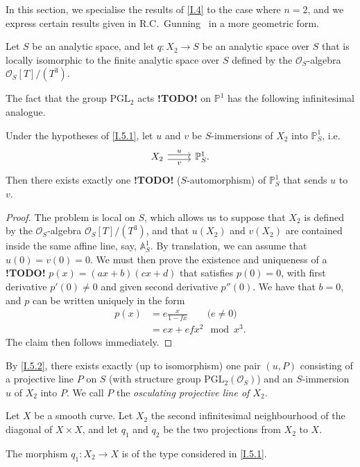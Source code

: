 \documentclass{report}
\theoremstyle{plain}
\newenvironment{lemma}[1]
    {\renewcommand\theinnercustomlemma{#1}\innercustomlemma}
    {\endinnercustomlemma}
\theoremstyle{definition}
\newenvironment{env}[1]
    {\renewcommand\theinnercustomenv{#1}\innercustomenv}
    {\endinnercustomenv}
\newcommand{\sh}{\mathscr}
\newcommand{\PP}{\mathbb{P}}
\renewcommand{\AA}{\mathbb{A}}
\newcommand{\todo}{\textbf{ !TODO! }}
\newcommand{\oldpage}[1]{\marginpar{\footnotesize$\Big\vert$ \textit{p.~#1}}}
\begin{document}
In this section, we specialise the results of \cref{I.4} to the case where $n=2$, and we express certain results given in R.C.~Gunning~\cite{11} in a more geometric form.

\begin{env}{5.1}
\label{I.5.1}
  Let $S$ be an analytic space, and let $q\colon X_2\to S$ be an analytic space over $S$ that is locally isomorphic to the finite analytic space over $S$ defined by the $\sh{O}_S$-algebra $\sh{O}_S[T]/(T^3)$.

  The fact that the group $\mathrm{PGL}_2$ acts \todo on $\PP^1$ has the following infinitesimal analogue.
\end{env}

\begin{lemma}{5.2}
\label{I.5.2}
  Under the hypotheses of \cref{I.5.1}, let $u$ and $v$ be $S$-immersions of $X_2$ into $\PP_S^1$, i.e.
  \[
    \begin{tikzcd}
      X_2 \rar[shift left=1,"u"] \rar[shift right=1,swap,"v"]
      & \PP_S^1.
    \end{tikzcd}
  \]
  Then there exists exactly one \todo ($S$-automorphism) of $\PP_S^1$ that sends $u$ to $v$.
\end{lemma}

\begin{proof}
  The problem is local on $S$, which allows us to suppose that $X_2$ is defined by the $\sh{O}_S$-algebra $\sh{O}_S[T]/(T^3)$, and that $u(X_2)$ and $v(X_2)$ are contained inside the same affine line, say, $\AA_S^1$.
  By translation, we can assume that $u(0)=v(0)=0$.
  We must then prove the existence and uniqueness of a \todo $p(x)=(ax+b)(cx+d)$ that satisfies $p(0)=0$, with first derivative $p'(0)\neq0$ and given second derivative $p''(0)$.
  We have that $b=0$, and $p$ can be written uniquely in the form
\oldpage{30}
  \[
    \begin{aligned}
      p(x)
      &= e\frac{x}{1-fx} \qquad\mbox{($e\neq0$)}
    \\&= ex + efx^2 \mod x^3.
    \end{aligned}
  \]
  The claim then follows immediately.
\end{proof}

\begin{env}{5.3}
\label{I.5.3}
  By \cref{I.5.2}, there exists exactly (up to isomorphism) one pair $(u,P)$ consisting of a projective line $P$ on $S$ (with structure group $\mathrm{PGL}_2(\sh{O}_S)$) and an $S$-immersion $u$ of $X_2$ into $P$.
  We call $P$ the \emph{osculating projective line of $X_2$}.

  Let $X$ be a smooth curve.
  Let $X_2$ the second infinitesimal neighbourhood of the diagonal of $X\times X$, and let $q_1$ and $q_2$ be the two projections from $X_2$ to $X$.

  The morphism $q_1\colon X_2\to X$ is of the type considered in \cref{I.5.1}.
\end{env}
\end{document}
